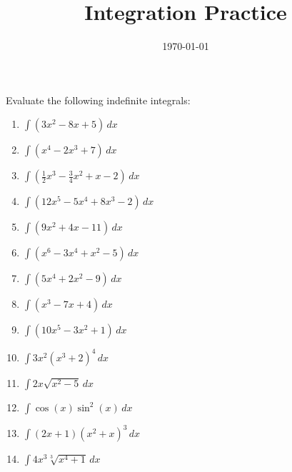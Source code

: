 \documentclass{article}
\begin{document}
\title{Integration Practice}
\date{\today}
\maketitle

Evaluate the following indefinite integrals:

\begin{enumerate}
\item $\int (3x^2 - 8x + 5) \, dx$ 
\item $\int (x^4 - 2x^3 + 7) \, dx$ 
\item $\int (\frac{1}{2}x^3 - \frac{3}{4}x^2 + x - 2) \, dx$ 
\item $\int (12x^5 - 5x^4 + 8x^3 - 2) \, dx$  
\item $\int (9x^2 + 4x - 11) \, dx$ 
\item $\int (x^6 - 3x^4 + x^2 - 5) \, dx$  
\item $\int (5x^4 + 2x^2 - 9) \, dx$
\item $\int (x^3 - 7x + 4) \, dx$
\item $\int (10x^5 - 3x^2 + 1) \, dx$
\item $\int 3x^2 (x^3 + 2)^4 \, dx$ 
\item $\int 2x \sqrt{x^2 - 5} \, dx$ 
\item $\int \cos(x) \sin^2(x) \, dx$ 
\item $\int  (2x + 1)(x^2 + x)^3 \, dx$
\item $\int 4x^3 \sqrt[3]{x^4 + 1} \, dx$
\end{enumerate}
\end{document}
